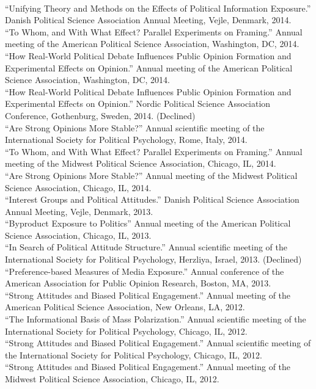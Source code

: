 \documentclass[12pt]{article}
\renewcommand{\section}[1]{\pagebreak[3]%
    \llap{\scshape\smash{\parbox[t]{\marginparwidth}{\raggedright {\color{lg}#1}}}}%
    \vspace{-\baselineskip}\par}
\newcommand{\topic}[1]{\pagebreak[3]\indent {\color{lg}{\footnotesize #1 }}\\}
\newcommand{\entry}[1]{\indent {\color{lg}\guillemotright}\hspace{2pt}#1\vspace{.25em}\\}
\begin{document}
\section{Conference\\Papers\\and\\Invited\\Presentations}
\topic{Conference Papers}
\entry{``Unifying Theory and Methods on the Effects of Political Information Exposure.'' Danish Political Science Association Annual Meeting, Vejle, Denmark, 2014.}
\entry{``To Whom, and With What Effect? Parallel Experiments on Framing.'' Annual meeting of the American Political Science Association, Washington, DC, 2014.}
\entry{``How Real-World Political Debate Influences Public Opinion Formation and Experimental Effects on Opinion.'' Annual meeting of the American Political Science Association, Washington, DC, 2014.}
\entry{``How Real-World Political Debate Influences Public Opinion Formation and Experimental Effects on Opinion.'' Nordic Political Science Association Conference, Gothenburg, Sweden, 2014. (Declined)}
\entry{``Are Strong Opinions More Stable?'' Annual scientific meeting of the International Society for Political Psychology, Rome, Italy, 2014.}
\entry{``To Whom, and With What Effect? Parallel Experiments on Framing.'' Annual meeting of the Midwest Political Science Association, Chicago, IL, 2014.}
\entry{``Are Strong Opinions More Stable?'' Annual meeting of the Midwest Political Science Association, Chicago, IL, 2014.}
\entry{``Interest Groups and Political Attitudes.'' Danish Political Science Association Annual Meeting, Vejle, Denmark, 2013.}
\entry{``Byproduct Exposure to Politics'' Annual meeting of the American Political Science Association, Chicago, IL, 2013.}
\entry{``In Search of Political Attitude Structure.'' Annual scientific meeting of the International Society for Political Psychology, Herzliya, Israel, 2013. (Declined)}
\entry{``Preference-based Measures of Media Exposure.'' Annual conference of the American Association for Public Opinion Research, Boston, MA, 2013.}
\entry{``Strong Attitudes and Biased Political Engagement.'' Annual meeting of the American Political Science Association, New Orleans, LA, 2012.}
\entry{``The Informational Basis of Mass Polarization.'' Annual scientific meeting of the International Society for Political Psychology, Chicago, IL, 2012.}
\entry{``Strong Attitudes and Biased Political Engagement.'' Annual scientific meeting of the International Society for Political Psychology, Chicago, IL, 2012.}
\entry{``Strong Attitudes and Biased Political Engagement.'' Annual meeting of the Midwest Political Science Association, Chicago, IL, 2012.}
\end{document}
